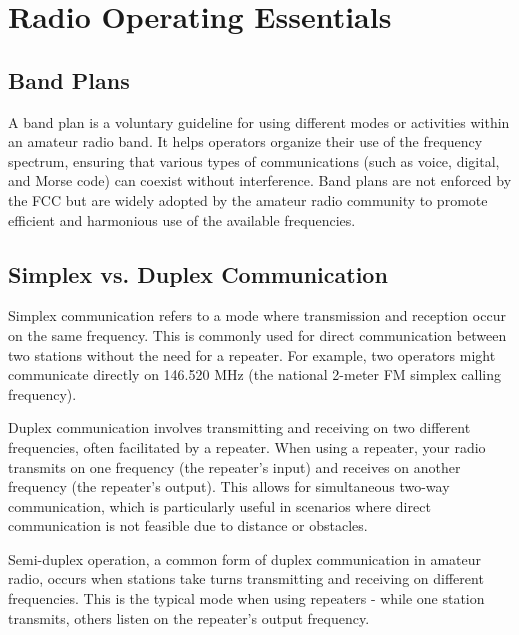 \section{Radio Operating Essentials}
\label{section:operating_essentials}

\subsection*{Band Plans}
A band plan is a voluntary guideline for using different modes or activities within an amateur radio band. It helps operators organize their use of the frequency spectrum, ensuring that various types of communications (such as voice, digital, and Morse code) can coexist without interference. Band plans are not enforced by the FCC but are widely adopted by the amateur radio community to promote efficient and harmonious use of the available frequencies.

\subsection*{Simplex vs. Duplex Communication}
Simplex communication refers to a mode where transmission and reception occur on the same frequency. This is commonly used for direct communication between two stations without the need for a repeater. For example, two operators might communicate directly on 146.520 MHz (the national 2-meter FM simplex calling frequency).

Duplex communication involves transmitting and receiving on two different frequencies, often facilitated by a repeater. When using a repeater, your radio transmits on one frequency (the repeater's input) and receives on another frequency (the repeater's output). This allows for simultaneous two-way communication, which is particularly useful in scenarios where direct communication is not feasible due to distance or obstacles.

Semi-duplex operation, a common form of duplex communication in amateur radio, occurs when stations take turns transmitting and receiving on different frequencies. This is the typical mode when using repeaters - while one station transmits, others listen on the repeater's output frequency.

